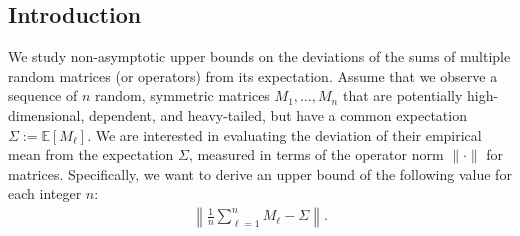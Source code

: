 \documentclass[11pt,a4paper]{article}
\theoremstyle{remark}
\theoremstyle{definition}
\theoremstyle{definition}
\newcommand{\Ep}{\mathbb{E}}
\newcommand{\rc}{\color{black}}
\begin{document}
\begin{bibunit}[apalike]

\setcounter{section}{0}
\setcounter{theorem}{0}

\begin{abstract}

We prove deviation inequalities for sums of high-dimensional random matrices and operators with dependence and {\rc heavy tails}. Estimation of high-dimensional matrices is a concern for numerous modern applications. However, most results are stated for independent observations. Therefore, it is critical to derive results for dependent and heavy-tailed matrices. In this paper, we derive a dimension-free upper bound on the deviation of the sums. Thus, the bound does not depend explicitly on the dimension of the matrices but rather on their effective rank. Our result generalizes several existing studies on the deviation of sums of matrices. It relies on two techniques: (i) a variational approximation of the dual of moment generating functions, and (ii) robustification through the truncation of the eigenvalues of the matrices. We reveal that our results are applicable to several problems, such as covariance matrix estimation, hidden Markov models, and overparameterized linear regression.
\end{abstract}


\section{Introduction}


We study non-asymptotic upper bounds on the deviations of the sums of multiple random matrices (or operators) from its expectation.
Assume that we observe a sequence of $n$ random, symmetric matrices $M_1,\ldots, M_n$ that are potentially high-dimensional, dependent, and heavy-tailed, but have a common expectation $\Sigma:= \Ep[M_\ell]$.
We are interested in evaluating the deviation of their empirical mean from the expectation $\Sigma$, measured in terms of the operator norm $\|\cdot\|$ for matrices. Specifically, we want to derive an upper bound of the following value for each integer $n$:
\begin{align*}
    \left\| \frac{1}{n} \sum_{\ell = 1}^n M_\ell - \Sigma \right\|.
\end{align*}


\end{bibunit}
\end{document}
